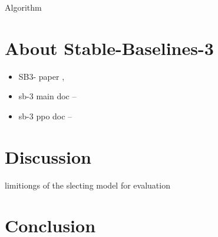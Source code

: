 \documentclass[a4paper, 12pt]{article}
\begin{document}
Algorithm
%

\section{About Stable-Baselines-3}
\begin{itemize}
	\item SB3- paper \citep{SB3}, \cite{SB3}
	\item sb-3 main doc -- \citep{SB3-main-doc}
	\item sb-3 ppo doc -- \citep{SB3-PPO-doc}
\end{itemize}

\section{Discussion}
limitiongs of the slecting model for evaluation


\section{Conclusion}



\end{document}
